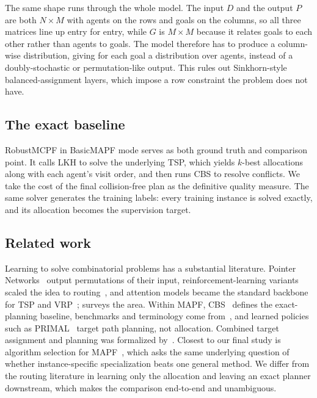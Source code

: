 \documentclass[11pt,a4paper]{article}
\begin{document}
The same shape runs through the whole model. The input $D$ and the output $P$ are both $N \times M$
with agents on the rows and goals on the columns, so all three matrices line up entry for entry,
while $G$ is $M \times M$ because it relates goals to each other rather than agents to goals. The
model therefore has to produce a column-wise distribution, giving for each goal a distribution over
agents, instead of a doubly-stochastic or permutation-like output. This rules out Sinkhorn-style
balanced-assignment layers, which impose a row constraint the problem does not have.

\subsection{The exact baseline}

RobustMCPF in BasicMAPF mode serves as both ground truth and comparison point. It calls LKH to
solve the underlying TSP, which yields $k$-best allocations along with each agent's visit order,
and then runs CBS to resolve conflicts. We take the cost of the final collision-free plan as the
definitive quality measure. The same solver generates the training labels: every training instance
is solved exactly, and its allocation becomes the supervision target.

\subsection{Related work}

Learning to solve combinatorial problems has a substantial literature. Pointer
Networks~\cite{pointernet} output permutations of their input, reinforcement-learning variants
scaled the idea to routing~\cite{bello}, and attention models became the standard backbone for TSP
and VRP~\cite{kool}; \cite{bengio} surveys the area. Within MAPF, CBS~\cite{cbs} defines the
exact-planning baseline, benchmarks and terminology come from~\cite{stern,sturtevant}, and learned
policies such as PRIMAL~\cite{primal} target path planning, not allocation. Combined target
assignment and planning was formalized by~\cite{ma_koenig}. Closest to our final study is algorithm
selection for MAPF~\cite{kaduri}, which asks the same underlying question of whether
instance-specific specialization beats one general method. We differ from the routing literature in
learning only the allocation and leaving an exact planner downstream, which makes the comparison
end-to-end and unambiguous.

\end{document}
